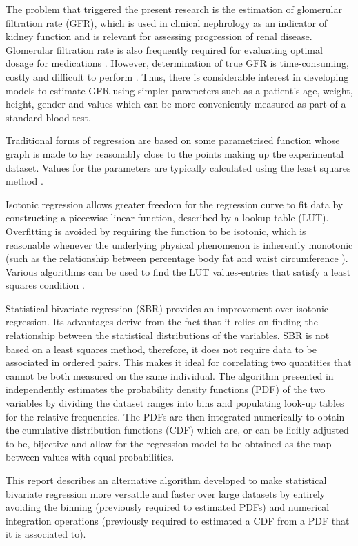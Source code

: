 \documentclass[10pt,final]{siamltex}
\begin{document}
The problem that triggered the present research is the estimation of glomerular filtration rate (GFR), which is used in clinical nephrology as an indicator of kidney function and is relevant for assessing progression of renal disease. Glomerular filtration rate is also frequently required for evaluating optimal dosage for medications \cite{gfrmed,gfralb}. However, determination of true GFR is time-consuming, costly and difficult to perform \cite{mgfr2,mgfr}. Thus, there is considerable interest in developing models to estimate GFR using simpler parameters such as a patient's age, weight, height, gender and values which can be more conveniently measured as part of a standard blood test.

Traditional forms of regression are based on some parametrised function whose graph is made to lay reasonably close to the points making up the experimental dataset. Values for the parameters are typically calculated using the least squares method \cite{book}.

Isotonic regression allows greater freedom for the regression curve to fit data by constructing a piecewise linear function, described by a lookup table (LUT). Overfitting is avoided by requiring the function to be isotonic, which is reasonable whenever the underlying physical phenomenon is inherently monotonic (such as the relationship between percentage body fat and waist circumference \cite{fat}). Various algorithms can be used to find the LUT values-entries that satisfy a least squares condition \cite{bestchak, pava}.

Statistical bivariate regression (SBR) provides an improvement over isotonic regression. Its advantages derive from the fact that it relies on finding the relationship between the statistical distributions of the variables. SBR is not based on a least squares method, therefore, it does not require data to be associated in ordered pairs. This makes it ideal for correlating two quantities that cannot be both measured on the same individual. The algorithm presented in \cite{fiori} independently estimates the probability density functions (PDF) of the two variables by dividing the dataset ranges into bins and populating look-up tables for the relative frequencies. The PDFs are then integrated numerically to obtain the cumulative distribution functions (CDF) which are, or can be licitly adjusted to be, bijective and allow for the regression model to be obtained as the map between values with equal probabilities.

This report describes an alternative algorithm developed to make statistical bivariate regression more versatile and faster over large datasets by entirely avoiding the binning (previously required to estimated PDFs) and numerical integration operations (previously required to estimated a CDF from a PDF that it is associated to).
\end{document}
